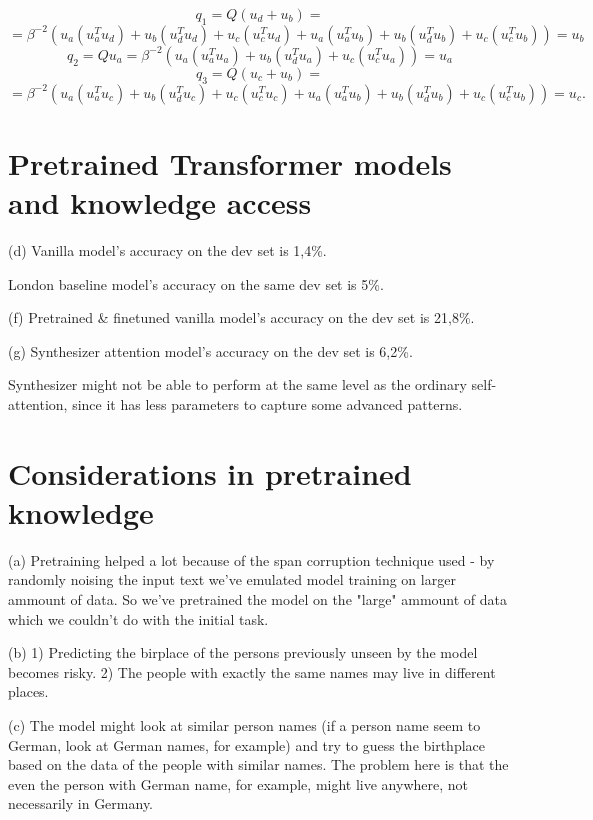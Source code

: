 \documentclass[12pt]{article}
\begin{document}
$$
q_1 = Q(u_d + u_b) = 
$$
$$=\beta^{-2}(u_a(u_a^Tu_d) + u_b(u_d^Tu_d) + u_c(u_c^Tu_d) + u_a(u_a^Tu_b) + u_b(u_d^Tu_b) + u_c(u_c^Tu_b)) = u_b
$$
$$
q_2 = Q u_a = \beta^{-2}(u_a(u_a^Tu_a) + u_b(u_d^Tu_a) + u_c(u_c^Tu_a)) = u_a
$$
$$
q_3 = Q(u_c + u_b) = 
$$
$$=\beta^{-2}(u_a(u_a^Tu_c) + u_b(u_d^Tu_c) + u_c(u_c^Tu_c) + u_a(u_a^Tu_b) + u_b(u_d^Tu_b) + u_c(u_c^Tu_b)) = u_c.
$$
\smallskip

\section{Pretrained Transformer models and knowledge access}

\noindent (d) Vanilla model's accuracy on the dev set is 1,4\%.

London baseline model's accuracy on the same dev set is 5\%.
\smallskip

\noindent (f) Pretrained & finetuned vanilla model's accuracy on the dev set is 21,8\%.
\smallskip

\noindent (g) Synthesizer attention model's accuracy on the dev set is 6,2\%.

Synthesizer might not be able to perform at the same level as the ordinary self-attention, since it has less parameters to capture some advanced patterns.

\section{Considerations in pretrained knowledge}

\noindent (a) Pretraining helped a lot because of the span corruption technique used - by randomly noising the input text we've emulated model training on larger ammount of data. So we've pretrained the model on the "large" ammount of data which we couldn't do with the initial task.
\smallskip

\noindent (b) 1) Predicting the birplace of the persons previously unseen by the model becomes risky. 2) The people with exactly the same names may live in different places.
\smallskip

\noindent (c) The model might look at similar person names (if a person name seem to German, look at German names, for example) and try to guess the birthplace based on the data of the people with similar names. The problem here is that the even the person with German name, for example, might live anywhere, not necessarily in Germany. 
\smallskip
\end{document}
